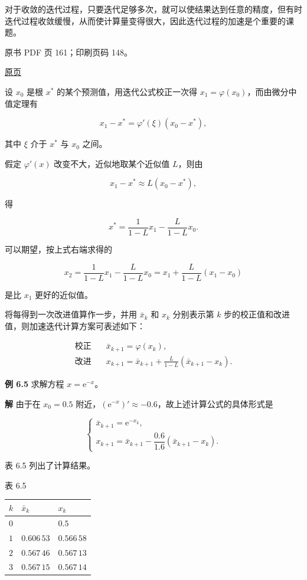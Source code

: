 对于收敛的迭代过程，只要迭代足够多次，就可以使结果达到任意的精度，但有时迭代过程收敛缓慢，从而使计算量变得很大，因此迭代过程的加速是个重要的课题。

\clearpage

原书 PDF 页 161；印刷页码 148。

\href{source-images/pdf-161.jpeg}{原页}

设 \(x_0\) 是根 \(x^*\) 的某个预测值，用迭代公式校正一次得 \(x_1=\varphi(x_0)\)，而由微分中值定理有

\[
x_1-x^*=\varphi'(\xi)(x_0-x^*),
\]

其中 \(\xi\) 介于 \(x^*\) 与 \(x_0\) 之间。

假定 \(\varphi'(x)\) 改变不大，近似地取某个近似值 \(L\)，则由

\[
x_1-x^*\approx L(x_0-x^*),
\]

得

\[
x^*=\frac{1}{1-L}x_1-\frac{L}{1-L}x_0.
\tag{6.2.9}
\]

可以期望，按上式右端求得的

\[
x_2=\frac{1}{1-L}x_1-\frac{L}{1-L}x_0=x_1+\frac{L}{1-L}(x_1-x_0)
\]

是比 \(x_1\) 更好的近似值。

将每得到一次改进值算作一步，并用 \(\bar{x}_k\) 和 \(x_k\) 分别表示第 \(k\) 步的校正值和改进值，则加速迭代计算方案可表述如下：

\[
\begin{aligned}
\text{校正}\quad&\bar{x}_{k+1}=\varphi(x_k),\\
\text{改进}\quad&x_{k+1}=\bar{x}_{k+1}+\frac{L}{1-L}(\bar{x}_{k+1}-x_k).
\end{aligned}
\tag{6.2.10}
\]

\textbf{例 6.5} 求解方程 \(x=\mathrm{e}^{-x}\)。

\textbf{解} 由于在 \(x_0=0.5\) 附近，\((\mathrm{e}^{-x})'\approx-0.6\)，故上述计算公式的具体形式是

\[
\begin{cases}
\bar{x}_{k+1}=\mathrm{e}^{-x_k},\\
x_{k+1}=\bar{x}_{k+1}-\dfrac{0.6}{1.6}(\bar{x}_{k+1}-x_k).
\end{cases}
\]

表 6.5 列出了计算结果。

表 6.5

{\def\LTcaptype{none} %
\begin{longtable}[]{@{}lll@{}}
\toprule\noalign{}
\(k\) & \(\bar{x}_k\) & \(x_k\) \\
\midrule\noalign{}
\endhead
\bottomrule\noalign{}
\endlastfoot
\(0\) & & \(0.5\) \\
\(1\) & \(0.606\,53\) & \(0.566\,58\) \\
\(2\) & \(0.567\,46\) & \(0.567\,13\) \\
\(3\) & \(0.567\,15\) & \(0.567\,14\) \\
\end{longtable}
}

